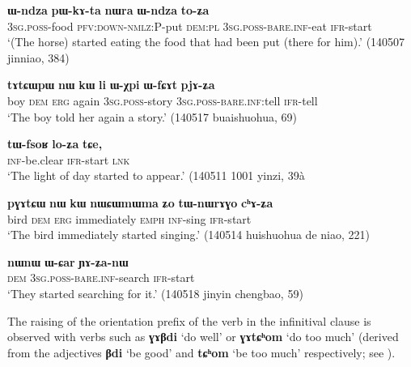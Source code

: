 \documentclass[oneside,a4paper,11pt]{article}
\newcommand{\ipa}[1]{\textbf{\phon#1}} %
\newcommand{\jpg}[2]{\ipa{#1} `#2'} %
\begin{document}
\begin{exe}
\ex \label{ex:toZa}
\gll \ipa{ɯ-ndza} 	\ipa{pɯ-kɤ-ta} 	\ipa{nɯra} 	\ipa{ɯ-ndza} 	\ipa{to-ʑa} \\
\textsc{3sg.poss}-food \textsc{pfv:down-nmlz:P}-put \textsc{dem:pl} \textsc{3sg.poss-bare.inf}-eat \textsc{ifr}-start \\
\glt `(The horse) started eating the food that had been put (there for him).' (140507 jinniao, 384)
\end{exe}

\begin{exe}
\ex \label{ex:pjAZa}
\gll
\ipa{tɤtɕɯpɯ} 	\ipa{nɯ} 	\ipa{kɯ} 	\ipa{li} \ipa{ɯ-χpi} 	\ipa{ɯ-fɕɤt} 	\ipa{pjɤ-ʑa} \\
boy \textsc{dem} \textsc{erg} again \textsc{3sg.poss}-story \textsc{3sg.poss-bare.inf}:tell \textsc{ifr}-tell \\
\glt `The boy told her again a story.' (140517 buaishuohua, 69)
\end{exe}

\begin{exe}
\ex \label{ex:loZa}
\gll
\ipa{tɯ-fsoʁ} 	\ipa{lo-ʑa} 	\ipa{tɕe,} \\
\textsc{inf}-be.clear \textsc{ifr}-start \textsc{lnk} \\
\glt `The light of day started to appear.' (140511 1001 yinzi, 39à
\end{exe}

\begin{exe}
\ex \label{ex:chAZa}
\gll \ipa{pɣɤtɕɯ} 	\ipa{nɯ} 	\ipa{kɯ} 	\ipa{nɯɕɯmɯma} 	\ipa{ʑo} 	\ipa{tɯ-nɯrɤɣo} 	\ipa{cʰɤ-ʑa} \\
bird \textsc{dem} \textsc{erg} immediately \textsc{emph} \textsc{inf}-sing \textsc{ifr}-start \\
\glt `The bird immediately started singing.' (140514 huishuohua de niao, 221)
\end{exe}

\begin{exe}
\ex \label{ex:YAZa}
\gll
\ipa{nɯnɯ} 	\ipa{ɯ-ɕar} 	\ipa{ɲɤ-ʑa-nɯ} \\
\textsc{dem} \textsc{3sg.poss-bare.inf}-search \textsc{ifr}-start \\
\glt `They started searching for it.' (140518 jinyin chengbao, 59)
\end{exe}

The raising of the orientation prefix of the verb in the infinitival clause is observed with verbs such as \jpg{ɣɤβdi}{do well} or \jpg{ɣɤtɕʰom}{do too much} (derived from the adjectives \jpg{βdi}{be good} and \jpg{tɕʰom}{be too much} respectively; see \citealt[184]{jacques15causative}).
\end{document}
